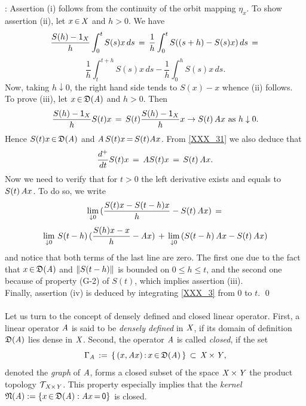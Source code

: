 \documentclass[11pt,twoside]{article}
\begin{document}
\subparagraph{}
\Proof:
Assertion (i) follows from the continuity of the orbit mapping $\eta_x$.
To show assertion (ii), let $x {\,\in\,} \mathit{X}$ and $h > 0$. We have
\[
\frac{S(h)-{\mathsf{1}}_X}{h} \int_0^t S(s)x\,ds \,=\,
\frac{1}{h} \int_0^t  S((s+h)-S(s)x)\,ds \,=\,
\]
\[
\frac{1}{h} \int_t^{t+h}  S(s)x \, ds - \frac{1}{h} \int_0^h S(s)x \,ds.
\]
Now, taking $h \downarrow 0$,
the right hand side tends to $S(x)-x$ whence (ii) follows.\\
To prove (iii), let $x {\,\in\,} \mathfrak{D}(\mathit{A})$ and $h > 0$. Then
\begin{equation}\label{XXX_31}
\frac{S(h)-{\mathsf{1}}_X}{h} S(t) x \,=\,
S(t) \frac{S(h)-{\mathsf{1}}_X}{h} x \to S(t) \,\mathit{A} x \mbox{ as } h \downarrow 0.
\end{equation}
Hence $S(t)x {\,\in\,} \mathfrak{D}(\mathit{A})$ and $\mathit{A}\,S(t)x {\,=\,} S(t)\mathit{A} x$.
From \eqref{XXX_31} we also deduce that
\[
\frac{d^+}{dt} S(t) x \,=\, \mathit{A} S(t)x \,=\, S(t) \,\mathit{A} x.
\]
Now we need to verify that for $t>0$ the left derivative exists and
equals to $S(t)\,\mathit{A} x$.
To do so, we write
\[
\lim_{\downarrow 0}\,(\frac{S(t)x-S(t-h)x}{h} - S(t)\,\mathit{A} x) \,=\,
\]
\[
\lim_{\downarrow 0}\,S(t-h)\, (\frac{S(h)x-x}{h} - \mathit{A} x) \, + \,
\lim_{\downarrow 0}\,(S(t-h)\,\mathit{A} x -S(t) \, \mathit{A} x)
\]
and notice that both terms of the last line are zero.
The first one due to the fact that $x {\,\in\,} \mathfrak{D}(\mathit{A})$ and
$\left\lVert S(t-h) \right\rVert$ is bounded on $0 \leq h \leq t$,
and the second one because of property (G-2) of $S(t)$,
which implies assertion (iii).\\
Finally,
assertion (iv) is deduced by integrating \eqref{XXX_3} from $0$ to $t$.
\qed

\paragraph{} %
Let us turn to the concept of densely defined and closed linear operator.
First,
a linear operator $\mathit{A}$ is said to be \textit{densely defined} in $\mathit{X}$,
if its domain of definition $\mathfrak{D}(\mathit{A})$ lies dense in $\mathit{X}$.
Second,
the operator $\mathit{A}$ is called \textit{closed},
if the set
\[
\Gamma_{\mathit{A}} \,:=\,
\{\,(x,\mathit{A} x) {\,:\,}x {\,\in\,} \mathfrak{D}(\mathit{A})\,\} \; {\,\subset\,} \; \mathit{X} {\,\times\,} \mathit{Y},
\]
denoted the \textit{graph} of $\mathit{A}$,
forms a closed subset of the space $\mathit{X} {\,\times\,} \mathit{Y}$
{\wrt} the product topology $\mathcal{T}_{\,\mathit{X} {\times} \mathit{Y}}$.
This property especially implies that the \textit{kernel}
$\mathfrak{N}(\mathit{A}) := \{x {\,\in\,} \mathfrak{D}(\mathit{A}): \mathit{A} x {\,=\,} {\mathsf{0}}\}$
is closed.
\end{document}
